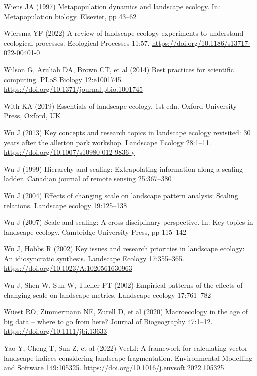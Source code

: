 \documentclass[
  10pt,
  a4paperpaper,
]{article}
\newlength{\cslhangindent}
\newenvironment{CSLReferences}[2] %
 {\begin{list}{}{%
  \setlength{\itemindent}{0pt}
  \setlength{\leftmargin}{0pt}
  \setlength{\parsep}{0pt}
  \ifodd #1
   \setlength{\leftmargin}{\cslhangindent}
   \setlength{\itemindent}{-1\cslhangindent}
  \fi
  \setlength{\itemsep}{#2\baselineskip}}}
 {\end{list}}
\begin{document}
\begin{CSLReferences}{1}{1}
Wiens JA (1997)
\href{https://doi.org/10.1016/B978-012323445-2/50005-5}{Metapopulation
dynamics and landscape ecology}. In: Metapopulation biology. Elsevier,
pp 43--62

Wiersma YF (2022) A review of landscape ecology experiments to
understand ecological processes. Ecological Processes 11:57.
\url{https://doi.org/10.1186/s13717-022-00401-0}

Wilson G, Aruliah DA, Brown CT, et al (2014) Best practices for
scientific computing. PLoS Biology 12:e1001745.
\url{https://doi.org/10.1371/journal.pbio.1001745}

With KA (2019) Essentials of landscape ecology, 1st edn. Oxford
University Press, Oxford, UK

Wu J (2013) Key concepts and research topics in landscape ecology
revisited: 30 years after the allerton park workshop. Landscape Ecology
28:1--11. \url{https://doi.org/10.1007/s10980-012-9836-y}

Wu J (1999) Hierarchy and scaling: Extrapolating information along a
scaling ladder. Canadian journal of remote sensing 25:367--380

Wu J (2004) Effects of changing scale on landscape pattern analysis:
Scaling relations. Landscape ecology 19:125--138

Wu J (2007) Scale and scaling: A cross-disciplinary perspective. In: Key
topics in landscape ecology. Cambridge University Press, pp 115--142

Wu J, Hobbs R (2002) Key issues and research priorities in landscape
ecology: An idiosyncratic synthesis. Landscape Ecology 17:355--365.
\url{https://doi.org/10.1023/A:1020561630963}

Wu J, Shen W, Sun W, Tueller PT (2002) Empirical patterns of the effects
of changing scale on landscape metrics. Landscape ecology 17:761--782

Wüest RO, Zimmermann NE, Zurell D, et al (2020) Macroecology in the age
of big data -- where to go from here? Journal of Biogeography 47:1--12.
\url{https://doi.org/10.1111/jbi.13633}

Yao Y, Cheng T, Sun Z, et al (2022) VecLI: A framework for calculating
vector landscape indices considering landscape fragmentation.
Environmental Modelling and Software 149:105325.
\url{https://doi.org/10.1016/j.envsoft.2022.105325}


\end{CSLReferences}
\end{document}
